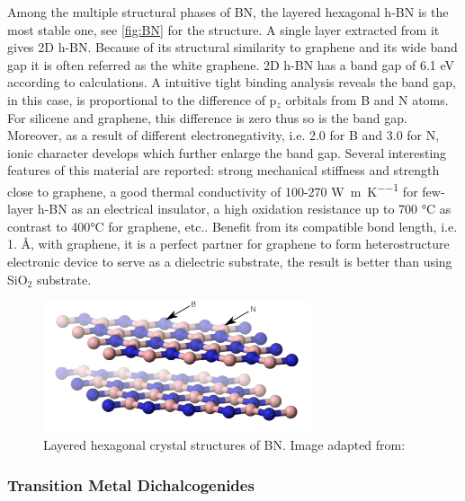 Among the multiple structural phases of BN, the layered hexagonal h-BN is the most stable one, see \autoref{fig:BN} for the structure. A single layer extracted from it gives 2D h-BN. Because of its structural similarity to graphene and its wide band gap it is often referred as the white graphene\cite{alem2009atomically}. 2D h-BN has a band gap of 6.1 eV according to calculations. A intuitive tight binding analysis reveals the band gap, in this case, is proportional to the difference of p$_z$ orbitals from B and N atoms. For silicene and graphene, this difference is zero thus so is the band gap. Moreover, as a result of different electronegativity, i.e. 2.0 for B and 3.0 for N, ionic character develops which further enlarge the band gap\cite{zhuang2012}. Several interesting features of this material are reported: strong mechanical stiffness and strength close to graphene\cite{Bosak2006}, a good thermal conductivity of 100-270 \si{\watt\per\meter\per\kelvin} for few-layer h-BN\cite{Jo2013} as an electrical insulator, a high oxidation resistance up to 700 \si{\celsius} as contrast to 400\si{\celsius} for graphene\cite{li2016atomically}, etc.. Benefit from its compatible bond length, i.e. 1. \AA, with graphene, it is a perfect partner for graphene to form heterostructure electronic device to serve as a dielectric substrate\cite{Lee2013}, the result is better than using SiO$_2$ substrate\cite{dean2010boron}. 


\begin{figure}[htbp!] 
\centering  
\includegraphics[width=0.7\textwidth]{BN.png}
\caption{Layered hexagonal crystal structures of BN. Image adapted from:\cite{Benjah2007}}  
\label{fig:BN}
\end{figure} 


\subsubsection{Transition Metal Dichalcogenides}

